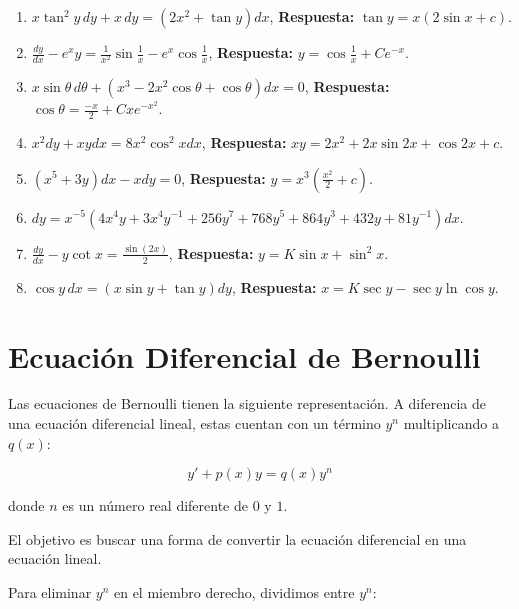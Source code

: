 \begin{enumerate}
    \item \( x \tan^2 y \, dy + x \, dy = (2x^2 + \tan y)dx \), \textbf{Respuesta:} \( \tan y = x (2\sin x + c) \).

    \item \( \frac{dy}{dx} - e^x y = \frac{1}{x^2} \sin \frac{1}{x} - e^x \cos \frac{1}{x} \), \textbf{Respuesta:} \( y = \cos \frac{1}{x} + C e^{-x} \).

    \item \( x \sin \theta \, d\theta + (x^3 - 2x^2 \cos \theta + \cos \theta)dx = 0 \), \textbf{Respuesta:} \( \cos \theta = \frac{-x}{2} + C x e^{-x^2} \).

    \item \( x^2 dy + xy dx = 8x^2 \cos^2 x dx \), \textbf{Respuesta:} \( xy = 2x^2 + 2x \sin 2x + \cos 2x + c \).

    \item \( (x^5 + 3y)dx - x dy = 0 \), \textbf{Respuesta:} \( y = x^3 \left(\frac{x^2}{2} + c \right) \).

    \item \( dy = x^{-5} (4x^4 y + 3x^4 y^{-1} + 256y^7 + 768y^5 + 864y^3 + 432y + 81y^{-1})dx \).

    \item \( \frac{dy}{dx} - y \cot x = \frac{\sin(2x)}{2} \), \textbf{Respuesta:} \( y = K \sin x + \sin^2 x \).

    \item \( \cos y \, dx = (x \sin y + \tan y) dy \), \textbf{Respuesta:} \( x = K \sec y - \sec y \ln \cos y \).

\end{enumerate}


\section{Ecuación Diferencial de Bernoulli}

Las ecuaciones de Bernoulli tienen la siguiente representación. A diferencia de una ecuación diferencial lineal, estas cuentan con un término \( y^n \) multiplicando a \( q(x) \):

\[
y' + p(x) y = q(x) y^n
\]

donde \( n \) es un número real diferente de \( 0 \) y \( 1 \).

El objetivo es buscar una forma de convertir la ecuación diferencial en una ecuación lineal.

Para eliminar \( y^n \) en el miembro derecho, dividimos entre \( y^n \):

